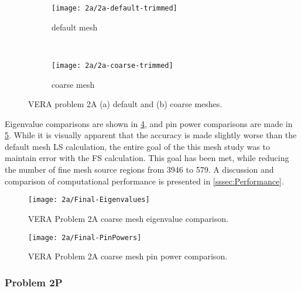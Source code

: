 {{{{{          \begin{figure}[h]
              \centering
              \begin{subfigure}[t]{0.45\textwidth}
                  \centering
                  \texttt{[image: 2a/2a-default-trimmed]}
                  \caption{default mesh\label{fig:LSMOC:2a:Default Mesh}}
              \end{subfigure}%
              ~
              \begin{subfigure}[t]{0.45\textwidth}
                  \centering
                  \texttt{[image: 2a/2a-coarse-trimmed]}
                  \caption{coarse mesh\label{fig:LSMOC:2a:Coarse Mesh}}
              \end{subfigure}
              \caption{VERA problem 2A (a) default and (b) coarse meshes.\label{figs:LSMOC:2a:Meshes}}
          \end{figure}

          Eigenvalue comparisons are shown in \cref{fig:LSMOC:2A:Coarse Mesh:Eigenvalues}, and pin power comparisons are made in \cref{fig:LSMOC:2A:Coarse Mesh:PinPowers}.
          While it is visually apparent that the accuracy is made slightly worse than the default mesh \ac{LS} calculation, the entire goal of the this mesh study was to maintain error with the \ac{FS} calculation.
          This goal has been met, while reducing the number of fine mesh source regions from 3946 to 579.
          A discussion and comparison of computational performance is presented in \cref{sssec:Performance}.

          \begin{figure}
            \centering
            \texttt{[image: 2a/Final-Eigenvalues]}
            \caption{VERA Problem 2A coarse mesh eigenvalue comparison. \label{fig:LSMOC:2A:Coarse Mesh:Eigenvalues}}
          \end{figure}
          \begin{figure}
            \centering
            \texttt{[image: 2a/Final-PinPowers]}
            \caption{VERA Problem 2A coarse mesh pin power comparison. \label{fig:LSMOC:2A:Coarse Mesh:PinPowers}}
          \end{figure}
        }
      }

      \subsubsection{Problem 2P}{\label{sssec:LSMOC:Problem 2P}
}}}}
